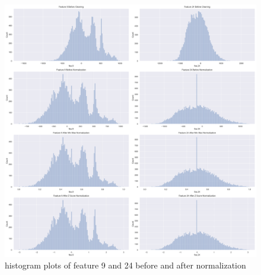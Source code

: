 

%
%

\begin{figure}[!ht]
 \centering
\includegraphics[width=6.1in]{assignment1/1-3-histograms.png}
\caption{\label{fig:fig1}histogram plots of feature 9 and 24 before and after normalization}
\end{figure}
